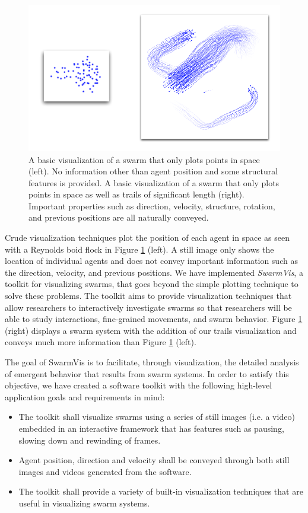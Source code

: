 \documentclass[conference]{IEEEtran}
\begin{document}
\begin{figure}[ht]
\centering
\includegraphics[scale=.55]{images/intro.pdf}
\caption{A basic visualization of a swarm that only plots points in space (left).
No information other than agent position and some structural features is provided.
A basic visualization of a swarm that only plots points in space as well as trails of significant length (right).
Important properties such as direction, velocity, structure, rotation,
and previous positions are all naturally conveyed.
}
\label{Intro}
\end{figure}

Crude visualization techniques plot the position of each agent in space as seen with a Reynolds boid flock\cite{reynolds1987} in Figure \ref{Intro} (left).
A still image only shows the location of individual agents and does not convey important information such as the direction, velocity, and previous positions.
We have implemented \textit{SwarmVis}, a toolkit for visualizing swarms, that goes beyond the simple plotting technique to solve these problems. The toolkit aims to provide visualization techniques that allow researchers to interactively investigate swarms so that researchers will be able to study interactions, fine-grained movements, and swarm behavior. Figure \ref{Intro} (right) displays a swarm system with
the addition of our trails visualization and conveys much more information than Figure \ref{Intro} (left).


The goal of SwarmVis is to facilitate, through visualization, the detailed analysis of emergent behavior that results from swarm systems. In order to satisfy this objective, we have created a software toolkit with the following high-level application goals and requirements in mind:
\begin{itemize}
\item The toolkit shall visualize swarms using a series of still images (i.e. a video) embedded in an interactive framework that has features such as pausing, slowing down and rewinding of frames.
\item Agent position, direction and velocity shall be conveyed through both still images and videos generated from the software.
\item The toolkit shall provide a variety of built-in visualization techniques that are useful in visualizing swarm systems.
\end{itemize}
\end{document}
